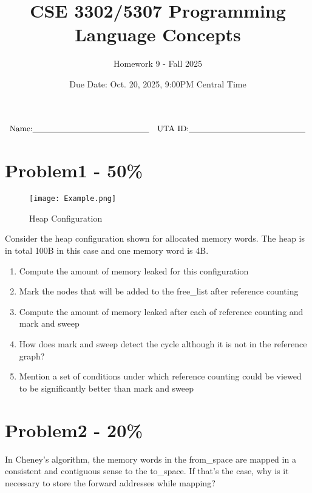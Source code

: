 \documentclass{article}
\newcommand{\studentinfo}{
    $$\begin{array}{cc}
        \noindent \text{Name:} \underline{\hspace{5cm}} &
            \text{UTA ID:} \underline{\hspace{5cm}}\\
    \end{array}$$
}
\begin{document}
\title{CSE 3302/5307 Programming Language Concepts}
\author{Homework 9 - Fall 2025}
\date{Due Date: Oct. 20, 2025, 9:00PM Central Time}
\maketitle
\thispagestyle{fancy}

\studentinfo


\section*{Problem1 - 50\%}

\FloatBarrier %
\begin{figure}[h]
    \centering
    \texttt{[image: Example.png]}
    \caption{Heap Configuration}
    \label{fig:example}
\end{figure}

\noindent
Consider the heap configuration shown for allocated memory words. The heap is in total 100B in this case and one memory word is 4B.

\begin{enumerate}[label=\alph*)]
    \item Compute the amount of memory leaked for this configuration
    \item Mark the nodes that will be added to the free\_list after reference counting
    \item Compute the amount of memory leaked after each of reference counting and mark and sweep
    \item How does mark and sweep detect the cycle although it is not in the reference graph?
    \item Mention a set of conditions under which reference counting could be viewed to be significantly better than mark and sweep
\end{enumerate}

\newpage 
\mbox{}
\newpage


\section*{Problem2 - 20\%}

In Cheney's algorithm, the memory words in the from\_space are mapped in a consistent and contiguous sense to the to\_space. If that's the case, why is it necessary to store the forward addresses while mapping?
\end{document}

